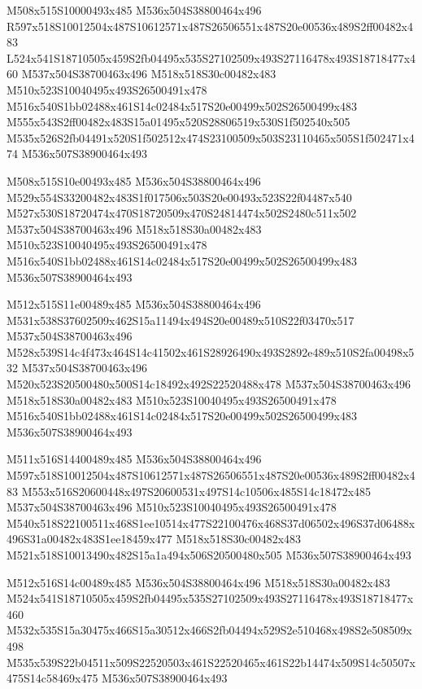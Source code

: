 \documentclass{article}
\begin{document}
\begin{multicols}{5}
\begin{center}

M508x515S10000493x485 %
M536x504S38800464x496 %
R597x518S10012504x487S10612571x487S26506551x487S20e00536x489S2ff00482x483 %
L524x541S18710505x459S2fb04495x535S27102509x493S27116478x493S18718477x460 %
M537x504S38700463x496 %
M518x518S30c00482x483 %
M510x523S10040495x493S26500491x478 %
M516x540S1bb02488x461S14c02484x517S20e00499x502S26500499x483 %
M555x543S2ff00482x483S15a01495x520S28806519x530S1f502540x505 %
M535x526S2fb04491x520S1f502512x474S23100509x503S23110465x505S1f502471x474 %
M536x507S38900464x493 %
\vfil
\columnbreak

M508x515S10e00493x485 %
M536x504S38800464x496 %
M529x554S33200482x483S1f017506x503S20e00493x523S22f04487x540 %
M527x530S18720474x470S18720509x470S24814474x502S2480c511x502 %
M537x504S38700463x496 %
M518x518S30a00482x483 %
M510x523S10040495x493S26500491x478 %
M516x540S1bb02488x461S14c02484x517S20e00499x502S26500499x483 %
M536x507S38900464x493 %
\vfil
\columnbreak

M512x515S11e00489x485 %
M536x504S38800464x496 %
M531x538S37602509x462S15a11494x494S20e00489x510S22f03470x517 %
M537x504S38700463x496 %
M528x539S14c4f473x464S14c41502x461S28926490x493S2892e489x510S2fa00498x532 %
M537x504S38700463x496 %
M520x523S20500480x500S14c18492x492S22520488x478 %
M537x504S38700463x496 %
M518x518S30a00482x483 %
M510x523S10040495x493S26500491x478 %
M516x540S1bb02488x461S14c02484x517S20e00499x502S26500499x483 %
M536x507S38900464x493 %
\vfil
\columnbreak

M511x516S14400489x485 %
M536x504S38800464x496 %
M597x518S10012504x487S10612571x487S26506551x487S20e00536x489S2ff00482x483 %
M553x516S20600448x497S20600531x497S14c10506x485S14c18472x485 %
M537x504S38700463x496 %
M510x523S10040495x493S26500491x478 %
M540x518S22100511x468S1ee10514x477S22100476x468S37d06502x496S37d06488x496S31a00482x483S1ee18459x477 %
M518x518S30c00482x483 %
M521x518S10013490x482S15a1a494x506S20500480x505 %
M536x507S38900464x493 %
\vfil
\columnbreak

M512x516S14c00489x485 %
M536x504S38800464x496 %
M518x518S30a00482x483 %
M524x541S18710505x459S2fb04495x535S27102509x493S27116478x493S18718477x460 %
M532x535S15a30475x466S15a30512x466S2fb04494x529S2e510468x498S2e508509x498 %
M535x539S22b04511x509S22520503x461S22520465x461S22b14474x509S14c50507x475S14c58469x475 %
M536x507S38900464x493 %
\vfil

\end{center}
\end{multicols}
\end{document}
